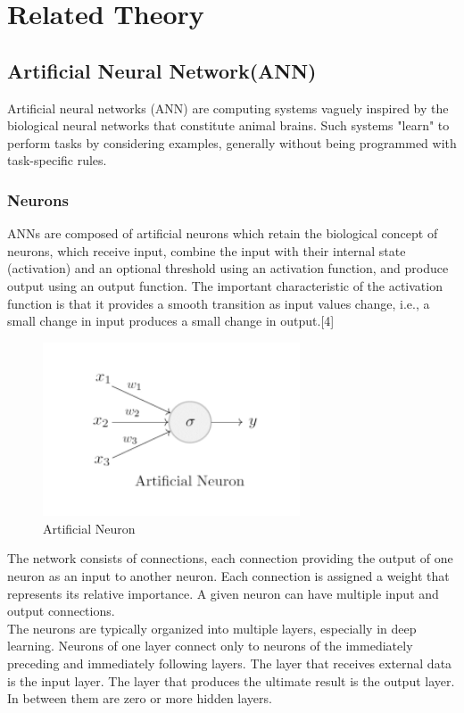    


\section{Related Theory}
\subsection{Artificial Neural Network(ANN)}
Artificial neural networks (ANN) are computing systems vaguely inspired by the biological neural networks that constitute animal brains. Such systems "learn" to perform tasks by considering examples, generally without being programmed with
task-specific rules\cite{bordia2020automated}.

\subsubsection{Neurons}
ANNs are composed of artificial neurons which retain the biological concept of
neurons, which receive input, combine the input with their internal state
(activation) and an optional threshold using an activation function, and produce
output using an output function. The important characteristic of the activation
function is that it provides a smooth transition as input values change, i.e., a small change in input produces a small change in output.[4]

\begin{figure}[tbh] %
\begin{center}
	\includegraphics[width = 3in]{images/artificialneuron.png}
	\caption{Artificial Neuron} %
	\label{figArtificialNeuron} %
\end{center}
\end{figure}

The network consists of connections, each connection providing the output of one
neuron as an input to another neuron. Each connection is assigned a weight that
represents its relative importance. A given neuron can have multiple input and
output connections.\\
The neurons are typically organized into multiple layers, especially in deep
learning. Neurons of one layer connect only to neurons of the immediately
preceding and immediately following layers. The layer that receives external data
is the input layer. The layer that produces the ultimate result is the output layer. In
between them are zero or more hidden layers.

